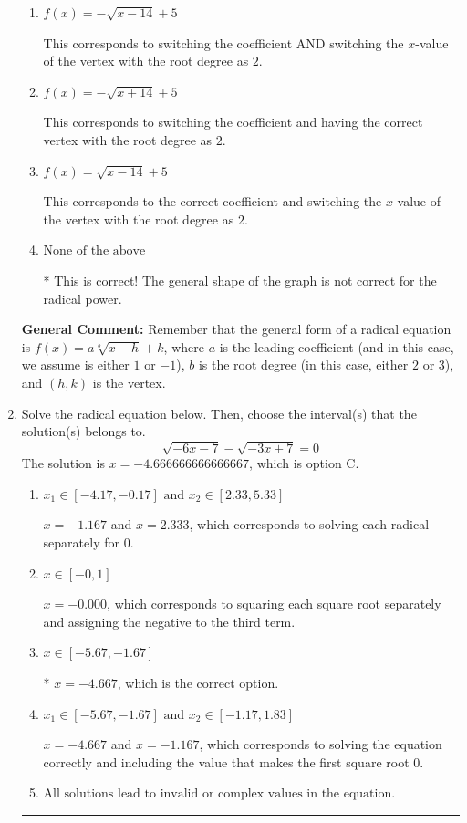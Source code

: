 \documentclass{extbook}[14pt]
\newcommand{\litem}[1]{\item #1

\rule{\textwidth}{0.4pt}}
\begin{document}
\begin{enumerate}
{\begin{enumerate}[label=\Alph*.]
This would be the correct option if the root degree was $3$.
\item \( f(x) = - \sqrt{x - 14} + 5 \)

This corresponds to switching the coefficient AND switching the $x$-value of the vertex with the root degree as $2$.
\item \( f(x) = - \sqrt{x + 14} + 5 \)

This corresponds to switching the coefficient and having the correct vertex with the root degree as $2$.
\item \( f(x) = \sqrt{x - 14} + 5 \)

This corresponds to the correct coefficient and switching the $x$-value of the vertex with the root degree as $2$.
\item \( \text{None of the above} \)

* This is correct! The general shape of the graph is not correct for the radical power.
\end{enumerate}

\textbf{General Comment:} Remember that the general form of a radical equation is $ f(x) = a \sqrt[b]{x - h} + k$, where $a$ is the leading coefficient (and in this case, we assume is either $1$ or $-1$), $b$ is the root degree (in this case, either $2$ or $3$), and $(h, k)$ is the vertex.
}
\litem{
Solve the radical equation below. Then, choose the interval(s) that the solution(s) belongs to.
\[ \sqrt{-6 x - 7} - \sqrt{-3 x + 7} = 0 \]The solution is \( x = -4.666666666666667 \), which is option C.\begin{enumerate}[label=\Alph*.]
\item \( x_1 \in [-4.17, -0.17] \text{ and } x_2 \in [2.33,5.33] \)

$x = -1.167$ and $x = 2.333$, which corresponds to solving each radical separately for 0.
\item \( x \in [-0,1] \)

$x = -0.000$, which corresponds to squaring each square root separately and assigning the negative to the third term.
\item \( x \in [-5.67,-1.67] \)

* $x = -4.667$, which is the correct option.
\item \( x_1 \in [-5.67, -1.67] \text{ and } x_2 \in [-1.17,1.83] \)

$x = -4.667$ and $x = -1.167$, which corresponds to solving the equation correctly and including the value that makes the first square root 0.
\item \( \text{All solutions lead to invalid or complex values in the equation.} \)


\end{enumerate}}
\end{enumerate}
\end{document}
